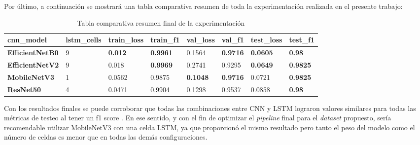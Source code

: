 Por último, a continuación se mostrará una tabla comparativa 
resumen de toda la experimentación realizada en el presente trabajo: 

\begin{table}[h!]
\centering
\begin{tabular}{|l|l|l|l|l|l|l|l|}
\hline
\textbf{cnn\_model}     & \textbf{lstm\_cells} & \textbf{train\_loss} & \textbf{train\_f1} & \textbf{val\_loss} & \textbf{val\_f1} & \textbf{test\_loss} & \textbf{test\_f1} \\ \hline
\textbf{EfficientNetB0} & 9                    & \textbf{0.012}       & \textbf{0.9961}    & 0.1564             & \textbf{0.9716}  & \textbf{0.0605}     & \textbf{0.98}     \\ \hline
\textbf{EfficientNetV2} & 9                    & 0.018                & \textbf{0.9969}    & 0.2741             & 0.9295           & \textbf{0.0649}     & \textbf{0.9825}   \\ \hline
\textbf{MobileNetV3}    & 1                    & 0.0562               & 0.9875             & \textbf{0.1048}    & \textbf{0.9716}  & 0.0721              & \textbf{0.9825}   \\ \hline
\textbf{ResNet50}       & 4                    & 0.0471               & 0.9904             & 0.1298             & 0.9537           & 0.0858              & \textbf{0.98}     \\ \hline
\end{tabular}
\caption{ Tabla comparativa resumen final de la experimentación}
\label{table:Resnet50}
\end{table}

Con los resultados finales se puede corroborar que todas las 
combinaciones entre CNN y LSTM lograron valores similares para 
todas las métricas de testeo al tener un f1 score . En ese sentido, 
y con el fin de optimizar el \textit{pipeline} final para el 
\textit{dataset} propuesto, sería recomendable utilizar MobileNetV3 
con una celda LSTM, ya que proporcionó el mismo resultado pero tanto 
el peso del modelo como el número de celdas es menor que en todas las 
demás configuraciones.
